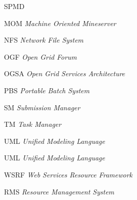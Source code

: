 \begin{listofabbrv}{SPMD}
        \item[MOM]   \emph{Machine Oriented Mineserver}
        \item[NFS]	\emph{Network File System}
        \item[OGF]   \emph{Open Grid Forum}
        \item[OGSA]  \emph{Open Grid Services Architecture}
        \item[PBS]   \emph{Portable Batch System}
        \item[SM]    \emph{Submission Manager}
        \item[TM]    \emph{Task Manager}
        \item[UML]	\emph{Unified Modeling Language}
        \item[UML]   \emph{Unified Modeling Language}
        \item[WSRF]  \emph{Web Services Resource Framework}
		  \item[RMS]   \emph{Resource Management System}
\end{listofabbrv}


\listoffigures

\listoftables

